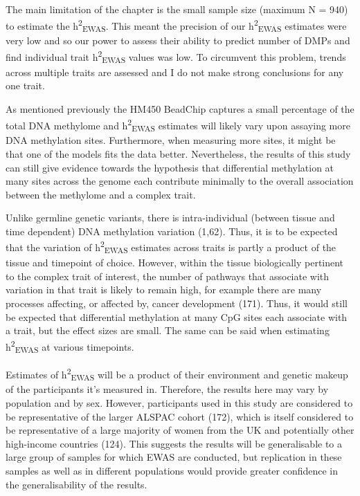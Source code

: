 \documentclass[11pt,oneside]{bristolthesis}
\begin{document}
The main limitation of the chapter is the small sample size (maximum N = 940) to estimate the h\textsuperscript{2}\textsubscript{EWAS}. This meant the precision of our h\textsuperscript{2}\textsubscript{EWAS} estimates were very low and so our power to assess their ability to predict number of DMPs and find individual trait h\textsuperscript{2}\textsubscript{EWAS} values was low. To circumvent this problem, trends across multiple traits are assessed and I do not make strong conclusions for any one trait.

As mentioned previously the HM450 BeadChip captures a small percentage of the total DNA methylome and h\textsuperscript{2}\textsubscript{EWAS} estimates will likely vary upon assaying more DNA methylation sites. Furthermore, when measuring more sites, it might be that one of the models fits the data better. Nevertheless, the results of this study can still give evidence towards the hypothesis that differential methylation at many sites across the genome each contribute minimally to the overall association between the methylome and a complex trait.

Unlike germline genetic variants, there is intra-individual (between tissue and time dependent) DNA methylation variation (1,62). Thus, it is to be expected that the variation of h\textsuperscript{2}\textsubscript{EWAS} estimates across traits is partly a product of the tissue and timepoint of choice. However, within the tissue biologically pertinent to the complex trait of interest, the number of pathways that associate with variation in that trait is likely to remain high, for example there are many processes affecting, or affected by, cancer development (171). Thus, it would still be expected that differential methylation at many CpG sites each associate with a trait, but the effect sizes are small. The same can be said when estimating h\textsuperscript{2}\textsubscript{EWAS} at various timepoints.

Estimates of h\textsuperscript{2}\textsubscript{EWAS} will be a product of their environment and genetic makeup of the participants it's measured in. Therefore, the results here may vary by population and by sex. However, participants used in this study are considered to be representative of the larger ALSPAC cohort (172), which is itself considered to be representative of a large majority of women from the UK and potentially other high-income countries (124). This suggests the results will be generalisable to a large group of samples for which EWAS are conducted, but replication in these samples as well as in different populations would provide greater confidence in the generalisability of the results.
\end{document}
